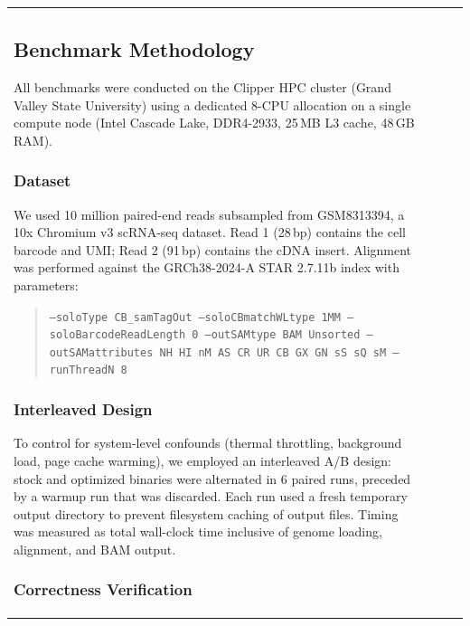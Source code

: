 \documentclass[11pt,twocolumn]{article}
\begin{document}
\begin{table}[t]
\begin{tabular}{@{}lrrr@{}}
\subsection{Benchmark Methodology}
\label{sec:bench}

All benchmarks were conducted on the Clipper HPC cluster (Grand Valley State University) using a dedicated 8-CPU allocation on a single compute node (Intel Cascade Lake, DDR4-2933, 25\,MB L3 cache, 48\,GB RAM).

\subsubsection{Dataset}

We used 10 million paired-end reads subsampled from GSM8313394, a 10x Chromium v3 scRNA-seq dataset. Read 1 (28\,bp) contains the cell barcode and UMI; Read 2 (91\,bp) contains the cDNA insert. Alignment was performed against the GRCh38-2024-A STAR 2.7.11b index with parameters:

\begin{quote}
\small\texttt{--soloType CB\_samTagOut --soloCBmatchWLtype 1MM --soloBarcodeReadLength 0 --outSAMtype BAM Unsorted --outSAMattributes NH HI nM AS CR UR CB GX GN sS sQ sM --runThreadN 8}
\end{quote}

\subsubsection{Interleaved Design}

To control for system-level confounds (thermal throttling, background load, page cache warming), we employed an interleaved A/B design: stock and optimized binaries were alternated in 6 paired runs, preceded by a warmup run that was discarded. Each run used a fresh temporary output directory to prevent filesystem caching of output files. Timing was measured as total wall-clock time inclusive of genome loading, alignment, and BAM output.

\subsubsection{Correctness Verification}


\end{tabular}
\end{table}
\end{document}
